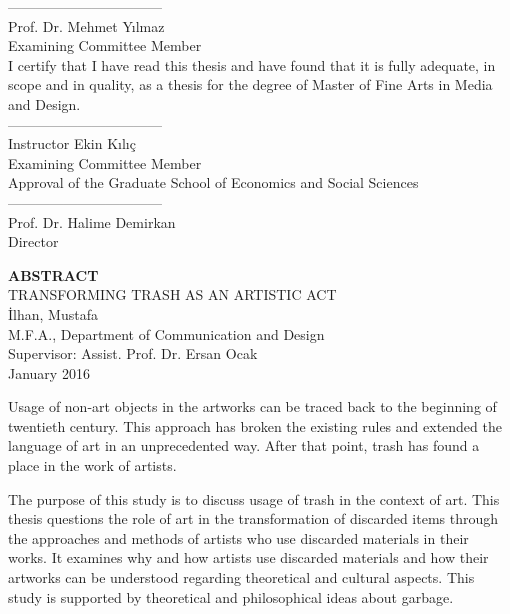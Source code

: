 \documentclass[12pt]{report}
\begin{document}
\noindent---------------------------------\\
Prof. Dr. Mehmet Yılmaz\\
Examining Committee Member\\

\noindent I certify that I have read this thesis and have found that it is fully adequate, in scope and in quality, as a thesis for the degree of Master of Fine Arts in Media and Design.\\

\noindent---------------------------------\\
Instructor Ekin Kılıç\\
Examining Committee Member\\

\noindent Approval of the Graduate School of Economics and Social Sciences\\

\noindent---------------------------------\\
Prof. Dr. Halime Demirkan\\
Director\\

\clearpage


\thispagestyle{plain}
{}
\doublespacing
\begin{center}
	\vspace*{13mm} %
	{\fontsize{14pt}{14pt}\selectfont \textbf{\MakeUppercase{Abstract}}}\\
    \vspace{\baselineskip}
    TRANSFORMING TRASH AS AN ARTISTIC ACT\\
    İlhan, Mustafa\\
    M.F.A., Department of Communication and Design\\
    Supervisor: Assist. Prof. Dr. Ersan Ocak\\
    \vspace{\baselineskip}
    January 2016
\end{center}
\par Usage of non-art objects in the artworks can be traced back to the beginning of twentieth century. This approach has broken the existing rules and extended the language of art in an unprecedented way. After that point, trash has found a place in the work of artists.

The purpose of this study is to discuss usage of trash in the context of art. This thesis questions the role of art in the transformation of discarded items through the approaches and methods of artists who use discarded materials in their works. It examines why and how artists use discarded materials and how their artworks can be understood regarding theoretical and cultural aspects. This study is supported by theoretical and philosophical ideas about garbage.
\end{document}
